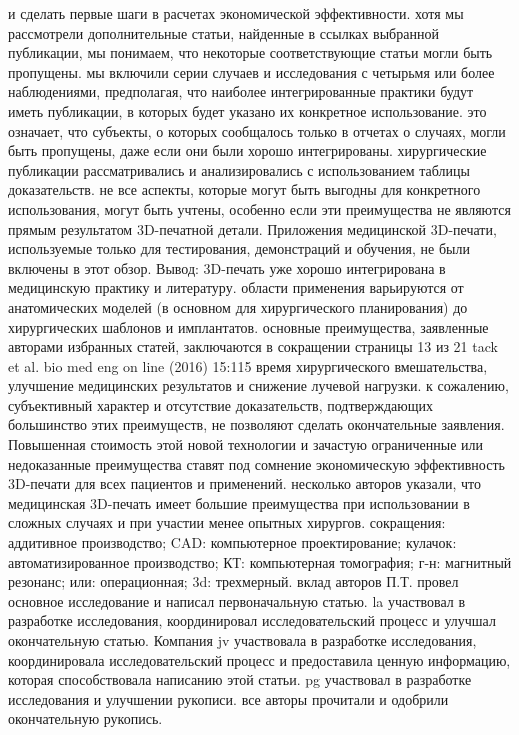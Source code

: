 и сделать первые шаги в расчетах экономической эффективности. хотя мы
рассмотрели дополнительные статьи, найденные в ссылках выбранной публикации, мы
понимаем, что некоторые соответствующие статьи могли быть пропущены. мы включили
серии случаев и исследования с четырьмя или более наблюдениями, предполагая, что
наиболее интегрированные практики будут иметь публикации, в которых будет
указано их конкретное использование. это означает, что субъекты, о которых
сообщалось только в отчетах о случаях, могли быть пропущены, даже если они были
хорошо интегрированы. хирургические публикации рассматривались и анализировались
с использованием таблицы доказательств. не все аспекты, которые могут быть
выгодны для конкретного использования, могут быть учтены, особенно если эти
преимущества не являются прямым результатом 3D-печатной детали. Приложения
медицинской 3D-печати, используемые только для тестирования, демонстраций и
обучения, не были включены в этот обзор. Вывод: 3D-печать уже хорошо
интегрирована в медицинскую практику и литературу. области применения
варьируются от анатомических моделей (в основном для хирургического
планирования) до хирургических шаблонов и имплантатов. основные преимущества,
заявленные авторами избранных статей, заключаются в сокращении страницы 13 из 21
tack et al. bio med eng on line (2016) 15:115 время хирургического
вмешательства, улучшение медицинских результатов и снижение лучевой нагрузки. к
сожалению, субъективный характер и отсутствие доказательств, подтверждающих
большинство этих преимуществ, не позволяют сделать окончательные заявления.
Повышенная стоимость этой новой технологии и зачастую ограниченные или
недоказанные преимущества ставят под сомнение экономическую эффективность
3D-печати для всех пациентов и применений. несколько авторов указали, что
медицинская 3D-печать имеет большие преимущества при использовании в сложных
случаях и при участии менее опытных хирургов. сокращения: аддитивное
производство; CAD: компьютерное проектирование; кулачок: автоматизированное
производство; КТ: компьютерная томография; г-н: магнитный резонанс; или:
операционная; 3d: трехмерный. вклад авторов П.Т. провел основное исследование и
написал первоначальную статью. la участвовал в разработке исследования,
координировал исследовательский процесс и улучшал окончательную статью. Компания
jv участвовала в разработке исследования, координировала исследовательский
процесс и предоставила ценную информацию, которая способствовала написанию этой
статьи. pg участвовал в разработке исследования и улучшении рукописи. все авторы
прочитали и одобрили окончательную рукопись.
